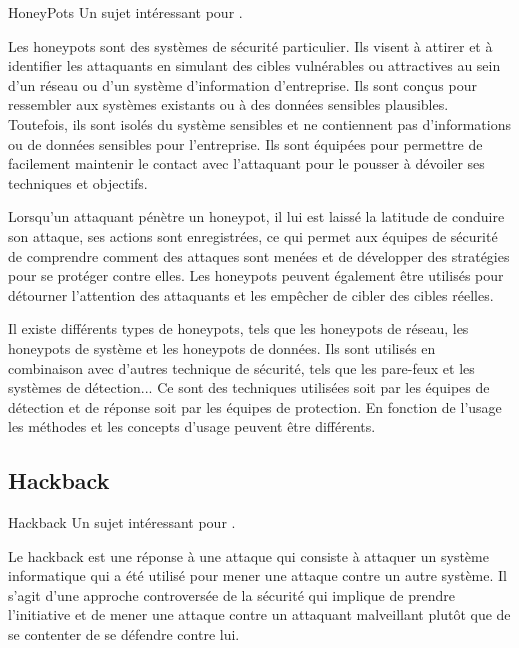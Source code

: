 \begin{techworkbox}{HoneyPots}
Un sujet intéressant pour \fichetech.\end{techworkbox}

Les honeypots sont des systèmes de sécurité particulier. Ils visent à attirer et à identifier les attaquants  en simulant des cibles vulnérables ou attractives au sein d'un réseau ou d'un système d'information d'entreprise. Ils sont conçus pour ressembler aux systèmes existants ou à des données sensibles plausibles. Toutefois, ils sont isolés du système sensibles et ne contiennent pas d'informations ou de données sensibles pour l'entreprise. Ils sont équipées pour permettre de facilement maintenir le contact avec l'attaquant pour le pousser à dévoiler ses techniques et objectifs.

Lorsqu'un attaquant pénètre un honeypot, il lui est laissé la latitude de conduire son attaque, ses actions sont enregistrées, ce qui permet aux équipes de sécurité de comprendre comment des attaques sont menées et de développer des stratégies pour se protéger contre elles. Les honeypots peuvent également être utilisés pour détourner l'attention des attaquants et les empêcher de cibler des cibles réelles.

Il existe différents types de honeypots, tels que les honeypots de réseau, les honeypots de système et les honeypots de données. Ils sont utilisés en combinaison avec d'autres technique de sécurité, tels que les pare-feux et les systèmes de détection...
Ce sont des techniques utilisées soit par les équipes de détection et de réponse soit par les équipes de protection. En fonction de l'usage les méthodes et les concepts d'usage peuvent être différents.


\subsection{Hackback}

\begin{techworkbox}{Hackback}
Un sujet intéressant pour \fichetech. 
\end{techworkbox}

Le hackback est une réponse à une attaque qui consiste à attaquer un système informatique qui a été utilisé pour mener une attaque contre un autre système. Il s'agit d'une approche controversée de la sécurité qui implique de prendre l'initiative et de mener une attaque contre un attaquant malveillant plutôt que de se contenter de se défendre contre lui.


